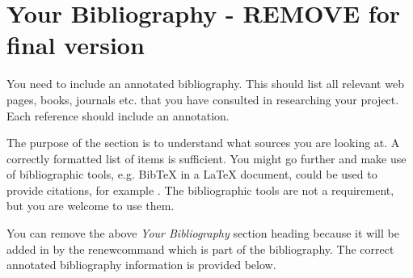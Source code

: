 \documentclass[11pt,fleqn,twoside]{article}
\begin{document}
\section*{Your Bibliography - REMOVE for final version}
%
You need to include an annotated bibliography. This should list all relevant web pages, books, journals etc. that you have consulted in researching your project. Each reference should include an annotation. 

The purpose of the section is to understand what sources you are looking at.  A correctly formatted list of items is sufficient. You might go further and make use of bibliographic tools, e.g. BibTeX in a LaTeX document, could be used to provide citations, for example \cite{NumericalRecipes} \cite{MarksPaper} \cite[99-101]{FailBlog} \cite{kittenpic_ref}.  The bibliographic tools are not a requirement, but you are welcome to use them.   

You can remove the above {\em Your Bibliography} section heading because it will be added in by the renewcommand which is part of the bibliography. The correct annotated bibliography information is provided below. 
%
%


\nocite{*} %

\newpage
{} 

%
%

\renewcommand{\refname}{Annotated Bibliography}  %
\end{document}

